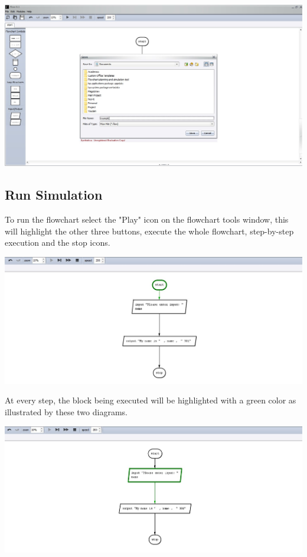 \documentclass[11pt,a4paper,titlepage]{article}
\begin{document}
	\includegraphics[width=14cm]{images/saveFile.jpg}
	
	\subsection{Run Simulation}
	To run the flowchart select the "Play" icon on the flowchart tools window, this will highlight the other three buttons, execute the whole flowchart, step-by-step execution and the stop icons.\newline \newline
	
	\includegraphics[width=14cm]{images/runSimulator2.jpg}\newline\newline
	
	At every step, the block being executed will be highlighted with a green color as illustrated by these two diagrams.\newline \newline
	
	\includegraphics[width=14cm]{images/runSimulator.jpg}
		
\end{document}
